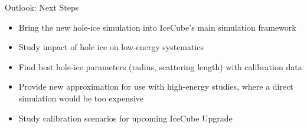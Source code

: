 
\begin{frame}{Outlook: Next Steps}
  \begin{itemize}
    \item Bring the new hole-ice simulation into IceCube's main simulation framework
    \item Study impact of hole ice on low-energy systematics
    \item Find best hole-ice parameters (radius, scattering length) with calibration data
    \item Provide new approximation for use with high-energy studies, where a direct simulation would be too expensive
    \item Study calibration scenarios for upcoming IceCube Upgrade
  \end{itemize}
\end{frame}
